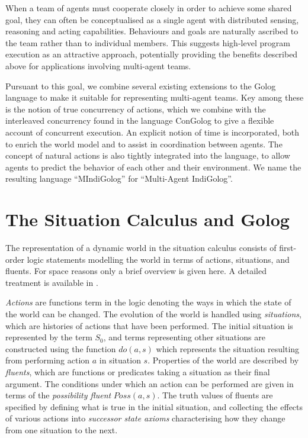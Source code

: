 \documentclass[letterpaper]{article}
\begin{document}
When a team of agents must cooperate closely in order to achieve some
shared goal, they can often be conceptualised as a single agent with
distributed sensing, reasoning and acting capabilities. Behaviours
and goals are naturally ascribed to the team rather than to individual
members.
This suggests high-level program execution as an attractive
approach, potentially providing the benefits described above for applications
involving multi-agent teams.

Pursuant to this goal, we combine several existing extensions to the
Golog language to make it suitable for representing multi-agent teams.
Key among these is the notion of true concurrency of actions, which
we combine with the interleaved concurrency found in the language
ConGolog to give a flexible account of concurrent
execution. An explicit notion of time is incorporated, both to enrich
the world model and to assist in coordination between agents. The
concept of natural actions is also tightly
integrated into the language, to allow agents to predict the behavior
of each other and their environment. We name the resulting language
``MIndiGolog'' for ``Multi-Agent IndiGolog''.

\section{The Situation Calculus and Golog}

The representation of a dynamic world in the situation calculus consists
of first-order logic statements modelling the world in terms of actions,
situations, and fluents.
For space reasons only a brief overview is given here.
A detailed treatment
is available in \cite{pirri99contributions_sitcalc}.

\emph{Actions} are functions term in the logic denoting the ways
in which the state of the world can be changed.
The evolution of the world is handled using \emph{situations}, which
are histories of actions that have been performed. The initial situation
is represented by the term $S_{0}$, and terms representing other situations
are constructed using the function $do(a,s)$ which represents the
situation resulting from performing action $a$ in situation $s$.
Properties of the world are described by \emph{fluents}, which are
functions or predicates taking a situation as their final argument.
The conditions under which an action can be performed are given in
terms of the \emph{possibility fluent} $Poss(a,s)$. The truth values
of fluents are specified by defining what is true in the initial situation,
and collecting the effects of various actions into \emph{successor
state axioms} characterising how they change from one situation to
the next.
\end{document}
